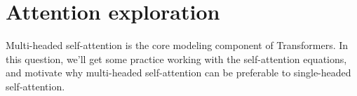 
\section{Attention exploration}
\label{sec:analysis}
Multi-headed self-attention is the core modeling component of Transformers.
In this question, we'll get some practice working with the self-attention equations, and motivate why multi-headed self-attention can be preferable to single-headed self-attention.



